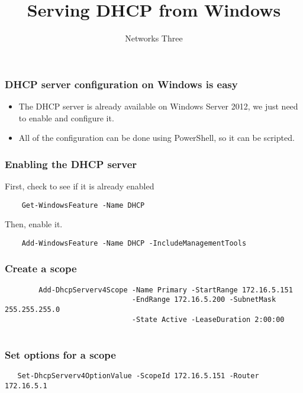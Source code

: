 \documentclass[10pt]{beamer}
\title{Serving DHCP from Windows}
\author[IN715]{Networks Three}
\institute[Otago Polytechnic]{
  Otago Polytechnic \\
  Dunedin, New Zealand \\
}
\date{}
\begin{document}
\begin{frame}[plain]
  \titlepage
\end{frame}


\begin{frame}
  \frametitle{DHCP server configuration on Windows is easy}

  \begin{itemize}
    \item The DHCP server is already available on Windows Server 2012, we just need to enable and configure it.
    \item All of the configuration can be done using PowerShell, so it can be scripted. 
  \end{itemize} 

\end{frame}


\begin{frame}[fragile]
  \frametitle{Enabling the DHCP server}
  First, check to see if it is already enabled
  \begin{verbatim}
    Get-WindowsFeature -Name DHCP
  \end{verbatim}  

Then, enable it.
  \begin{verbatim}
    Add-WindowsFeature -Name DHCP -IncludeManagementTools
  \end{verbatim}  
\end{frame}


\begin{frame}[fragile]
  \frametitle{Create a scope}
  \begin{verbatim}
        Add-DhcpServerv4Scope -Name Primary -StartRange 172.16.5.151 
                              -EndRange 172.16.5.200 -SubnetMask 255.255.255.0 
                              -State Active -LeaseDuration 2:00:00


  \end{verbatim}  
\end{frame}


\begin{frame}[fragile]
  \frametitle{Set options for a scope}
  \begin{verbatim}
   Set-DhcpServerv4OptionValue -ScopeId 172.16.5.151 -Router 172.16.5.1
  \end{verbatim}  
\end{frame}
\end{document}
